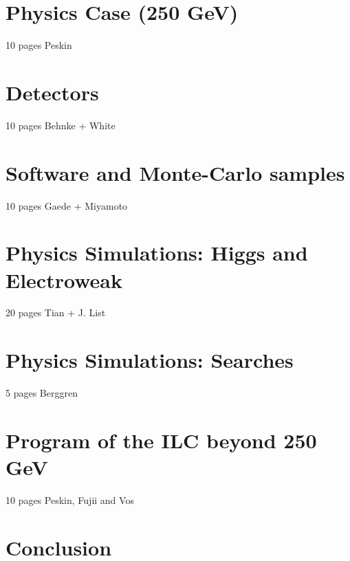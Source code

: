 \documentclass[%
 reprint,
 amsmath,amssymb,
 aps,
]{revtex4-1}
\begin{document}

   
   
\section{\label{sec:physics}Physics Case (250 GeV) }

10 pages Peskin
 

 
\section{\label{sec:detectors}Detectors }


  10 pages Behnke + White
  


\section{\label{sec:software}Software and Monte-Carlo samples}

   10 pages Gaede + Miyamoto
   
   

\section{\label{sec:higgs}Physics Simulations: Higgs and Electroweak}


  20 pages Tian + J. List
  
  

\section{\label{sec:searches}Physics Simulations: Searches }


  5 pages Berggren
  
  

\section{\label{sec:ILC-HE}Program of the ILC beyond 250 GeV }
  10 pages Peskin, Fujii and Vos \\
  


\section{\label{sec:conclusion}Conclusion}




%

\end{document}
